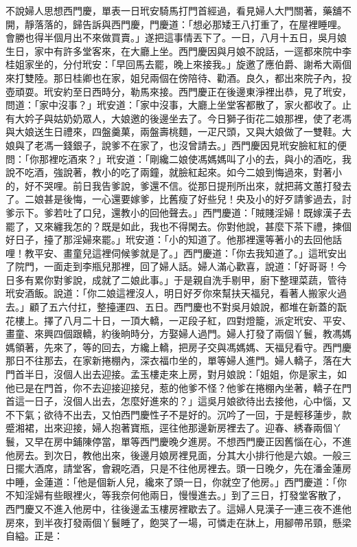 \begin{showcontents}{}
不說婦人思想西門慶，單表一日玳安騎馬打門首經過，看見婦人大門關著，藥舖不開，靜落落的，歸告訴與西門慶，門慶道：「想必那矮王八打重了，在屋裡睡哩。會勝也得半個月出不來做買賣。」遂把這事情丟下了。一日，八月十五日，吳月娘生日，家中有許多堂客來，在大廳上坐。西門慶因與月娘不說話，一逕都來院中李桂姐家坐的，分付玳安：「早回馬去罷，晚上來接我。」旋邀了應伯爵、謝希大兩個來打雙陸。那日桂卿也在家，姐兒兩個在傍陪待、勸酒。良久，都出來院子內，投壺頑耍。玳安約至日西時分，勒馬來接。西門慶正在後邊東淨裡出恭，見了玳安，問道：「家中沒事？」玳安道：「家中沒事，大廳上坐堂客都散了，家火都收了。止有大妗子與姑奶奶眾人，大娘邀的後邊坐去了。今日獅子街花二娘那裡，使了老馮與大娘送生日禮來，四盤羹菓，兩盤壽桃麵，一疋尺頭，又與大娘做了一雙鞋。大娘與了老馮一錢銀子，說爹不在家了，也沒曾請去。」西門慶因見玳安臉紅紅的便問：「你那裡吃酒來？」玳安道：「剛纔二娘使馮媽媽叫了小的去，與小的酒吃，我說不吃酒，強說著，教小的吃了兩鐘，就臉紅起來。如今二娘到悔過來，對著小的，好不哭哩。前日我告爹說，爹還不信。從那日提刑所出來，就把蔣文蕙打發去了。二娘甚是後悔，一心還要嫁爹，比舊瘦了好些兒！央及小的好歹請爹過去，討爹示下。爹若吐了口兒，還教小的回他聲去。」西門慶道：「賊賤淫婦！既嫁漢子去罷了，又來纏我怎的？既是如此，我也不得閑去。你對他說，甚麼下茶下禮，揀個好日子，擡了那淫婦來罷。」玳安道：「小的知道了。他那裡還等著小的去回他話哩！教平安、畫童兒這裡伺候爹就是了。」西門慶道：「你去我知道了。」這玳安出了院門，一面走到李瓶兒那裡，回了婦人話。婦人滿心歡喜，說道：「好哥哥！今日多有累你對爹說，成就了二娘此事。」于是親自洗手剔甲，廚下整理菜蔬，管待玳安酒飯。說道：「你二娘這裡沒人，明日好歹你來幫扶天福兒，看著人搬家火過去。」顧了五六付扛，整擡運四、五日。西門慶也不對吳月娘說，都堆在新蓋的翫花樓上。擇了八月二十日，一頂大轎，一疋段子紅，四對燈籠，派定玳安、平安、畫童、來興四個跟轎，約後晌時分，方娶婦人過門。婦人打發了兩個丫鬟，教馮媽媽領著，先來了，等的回去，方纔上轎，把房子交與馮媽媽、天福兒看守。西門慶那日不往那去，在家新捲棚內，深衣福巾坐的，單等婦人進門。婦人轎子，落在大門首半日，沒個人出去迎接。孟玉樓走來上房，對月娘說：「姐姐，你是家主，如他已是在門首，你不去迎接迎接兒，惹的他爹不怪？他爹在捲棚內坐著，轎子在門首這一日子，沒個人出去，怎麼好進來的？」這吳月娘欲待出去接他，心中惱，又不下氣；欲待不出去，又怕西門慶性子不是好的。沉吟了一回，于是輕移蓮步，款蹙湘裙，出來迎接，婦人抱著寶瓶，逕往他那邊新房裡去了。迎春、綉春兩個丫鬟，又早在房中鋪陳停當，單等西門慶晚夕進房。不想西門慶正因舊惱在心，不進他房去。到次日，教他出來，後邊月娘房裡見面，分其大小排行他是六娘。一般三日擺大酒席，請堂客，會親吃酒，只是不往他房裡去。頭一日晚夕，先在潘金蓮房中睡，金蓮道：「他是個新人兒，纔來了頭一日，你就空了他房。」西門慶道：「你不知淫婦有些眼裡火，等我奈何他兩日，慢慢進去。」到了三日，打發堂客散了，西門慶又不進入他房中，往後邊孟玉樓房裡歇去了。這婦人見漢子一連三夜不進他房來，到半夜打發兩個丫鬟睡了，飽哭了一場，可憐走在牀上，用腳帶吊頸，懸梁自縊。正是：


\end{showcontents}
